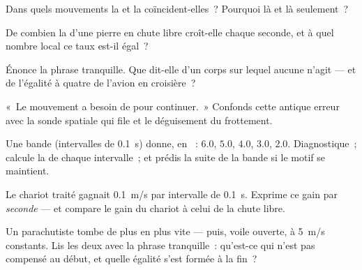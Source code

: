 \begin{exercise}[$\star$]\label{exo:g9:uniform-varied-motion:5}
Dans quels mouvements la  et la 
coïncident-elles~? Pourquoi là et là seulement~?
\end{exercise}

\begin{exercise}[$\star$]\label{exo:g9:uniform-varied-motion:6}
De combien la  d'une pierre en chute libre croît-elle chaque
seconde, et à quel nombre local ce taux est-il égal~?
\end{exercise}

\begin{exercise}[$\star$]\label{exo:g9:uniform-varied-motion:7}
Énonce la phrase tranquille. Que dit-elle d'un corps sur lequel aucune
 n'agit --- et de l'égalité à quatre de l'avion en croisière~?
\end{exercise}

\begin{exercise}[$\star$]\label{exo:g9:uniform-varied-motion:8}
«~Le mouvement a besoin de  pour continuer.~» Confonds cette
antique erreur avec la sonde spatiale qui file et le déguisement du
frottement.
\end{exercise}

\begin{exercise}[$\star\star$]\label{exo:g9:uniform-varied-motion:9}
Une bande (intervalles de \qty{0.1}{s}) donne, en ~: $6.0$,
$5.0$, $4.0$, $3.0$, $2.0$. Diagnostique~; calcule la  de
chaque intervalle~; et prédis la suite de la bande si le motif se
maintient.
\end{exercise}

\begin{exercise}[$\star\star$]\label{exo:g9:uniform-varied-motion:10}
Le chariot traité gagnait \qty{0.1}{m/s} par intervalle de
\qty{0.1}{s}. Exprime ce gain par \emph{seconde} --- et compare le
gain du chariot à celui de la chute libre.
\end{exercise}

\begin{exercise}[$\star\star$]\label{exo:g9:uniform-varied-motion:11}
Un parachutiste tombe de plus en plus vite --- puis, voile ouverte, à
\qty{5}{m/s} constants. Lis les deux  avec la phrase
tranquille~: qu'est-ce qui n'est pas compensé au début, et quelle
égalité s'est formée à la fin~?
\end{exercise}

